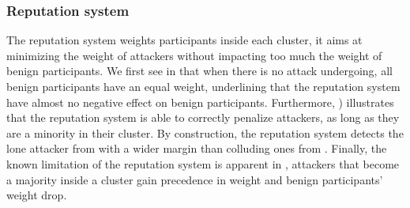 
\subsubsection{Reputation system\label{sec:eval.results.reput}}
The reputation system weights participants inside each cluster, it aims at minimizing the weight of attackers without impacting too much the weight of benign participants. 
We first see in  that when there is no attack undergoing, all benign participants have an equal weight, underlining that the reputation system have almost no negative effect on benign participants. 
Furthermore, ) illustrates that the reputation system is able to correctly penalize attackers, as long as they are a minority in their cluster. 
By construction, the reputation system detects the lone attacker from  with a wider margin than colluding ones from . 
Finally, the known limitation of the reputation system is apparent in , attackers that become a majority inside a cluster gain precedence in weight and benign participants’ weight
drop. 

